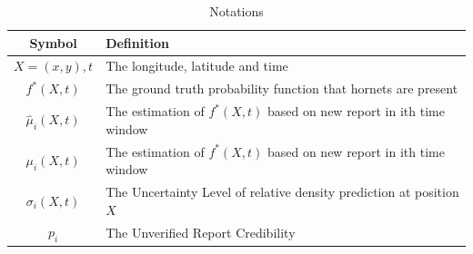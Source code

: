 \documentclass[12pt]{article}
\begin{document}
\begin{table}[H]
	\begin{center}
		\caption{Notations}
		\begin{tabular}{cl}
			\toprule
			\multicolumn{1}{m{3cm}}{\centering Symbol}
			&\multicolumn{1}{m{8cm}}{\centering Definition}\\
			\midrule
			$X=(x,y),t$&The longitude, latitude and time\\
			$f^*(X,t)$&The ground truth probability function that hornets are present\\
			$\hat{\mu}_i(X,t)$&The estimation of $f^*(X,t)$ based on new report in ith time window\\
			${\mu}_i(X,t)$&The estimation of $f^*(X,t)$ based on new report in ith time window\\
			$\sigma_i(X,t)$&The Uncertainty Level of relative density prediction at position $X$\\
			$p_i$&The Unverified Report Credibility\\
			\bottomrule
		\end{tabular}\label{Ntt}
	\end{center}
\end{table}
\end{document}
